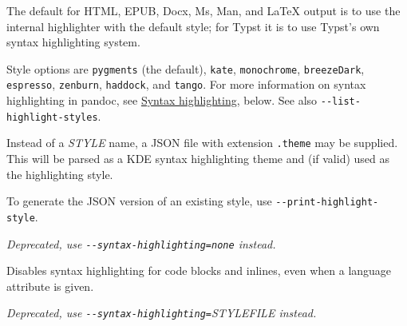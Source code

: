 \documentclass[
]{article}
\begin{document}
\begin{description}
The default for HTML, EPUB, Docx, Ms, Man, and LaTeX output is to use
the internal highlighter with the default style; for Typst it is to use
Typst's own syntax highlighting system.

Style options are \texttt{pygments} (the default), \texttt{kate},
\texttt{monochrome}, \texttt{breezeDark}, \texttt{espresso},
\texttt{zenburn}, \texttt{haddock}, and \texttt{tango}. For more
information on syntax highlighting in pandoc, see
\protect\hyperlink{syntax-highlighting}{Syntax highlighting}, below. See
also \texttt{-\/-list-highlight-styles}.

Instead of a \emph{STYLE} name, a JSON file with extension
\texttt{.theme} may be supplied. This will be parsed as a KDE syntax
highlighting theme and (if valid) used as the highlighting style.

To generate the JSON version of an existing style, use
\texttt{-\/-print-highlight-style}.
\item[\texttt{-\/-no-highlight}]
\emph{Deprecated, use \texttt{-\/-syntax-highlighting=none} instead.}

Disables syntax highlighting for code blocks and inlines, even when a
language attribute is given.
\item[\texttt{-\/-highlight-style=}\emph{STYLE}\textbar{}\emph{FILE}]
\emph{Deprecated, use
\texttt{-\/-syntax-highlighting=}\emph{STYLE}\textbar{}\emph{FILE}
instead.}


\end{description}
\end{document}
